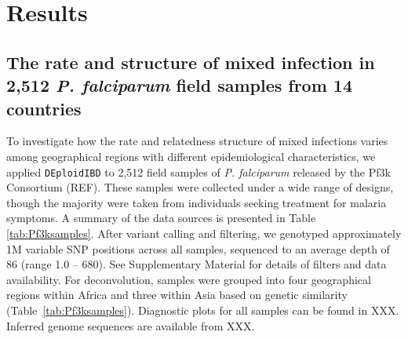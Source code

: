 \documentclass[9pt,lineno]{elife}
\begin{document}
\begin{figure}[htp]
\begin{center}
{}\label{fig:benchmark}
  \end{center}
\end{figure}




\section{Results}

\subsection{The rate and structure of mixed infection in 2,512 {\it P. falciparum} field samples from 14 countries}

To investigate how the rate and relatedness structure of mixed infections varies among geographical regions with different epidemiological characteristics, we applied \texttt{DEploidIBD} to 2,512 field samples of {\it P. falciparum} released by the Pf3k Consortium (REF).  These samples were collected under a wide range of designs, though the majority were taken from individuals seeking treatment for malaria symptoms.  A summary of the data sources is presented in Table \ref{tab:Pf3ksamples}.  After variant calling and filtering, we genotyped approximately 1M variable SNP positions across all samples, sequenced to an average depth of 86 (range 1.0 – 680).  See Supplementary Material for details of filters and data availability.  For deconvolution, samples were grouped into four geographical regions within Africa and three within Asia based on genetic similarity (Table~\ref{tab:Pf3ksamples}).  Diagnostic plots for all samples can be found in XXX.  Inferred genome sequences are available from XXX.
\end{document}
